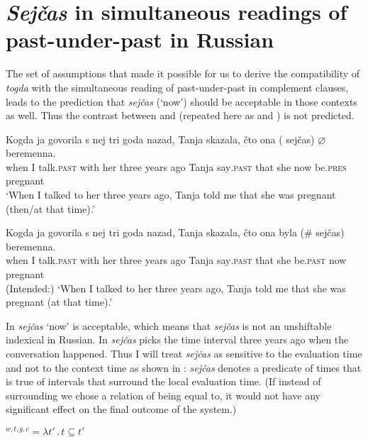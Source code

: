 \documentclass[output=paper,
modfonts,
newtxmath,
hidelinks
]{langscibook}
\begin{document}
\section{\textit{Sejčas} in simultaneous readings of past-under-past in Russian}\label{20:s3}

The set of assumptions that made it possible for us to derive the compatibility of \textit{togda} with the simultaneous reading of past-under-past in complement clauses, leads to the prediction that \textit{sejčas} (‘now’) should be acceptable in those contexts as well. Thus the contrast between  and  (repeated here as  and ) is not predicted.

\ea \label{20:ex43}
\gll Kogda ja govorila s nej tri goda nazad, Tanja skazala, čto ona\hspace{5pt} (\hspace{-2pt} sejčas) ${\varnothing}$ beremenna.\\
     when I talk\textsc{.past} with her three years ago Tanja say\textsc{.past} that she {} now be.\textsc{pres} pregnant\\
\glt `When I talked to her three years ago, Tanja told me that she was pregnant (then/at that time).'
\z

\ea \label{20:ex44}
\gll Kogda ja govorila s nej tri goda nazad, Tanja skazala, čto ona byla (\#\hspace{-2pt} sejčas) beremenna.\\
     when I talk\textsc{.past} with her three years ago Tanja say\textsc{.past} that she be.\textsc{past} {} now pregnant\\
\glt (Intended:) `When I talked to her three years ago, Tanja told me that she was pregnant (at that time).'
\z

\noindent In  \textit{sejčas} ‘now’ is acceptable, which means that \textit{sejčas} is not an unshiftable indexical in Russian. In  \textit{sejčas} picks the time interval three years ago when the conversation happened. Thus I will treat \textit{sejčas} as sensitive to the evaluation time and not to the context time as shown in : \textit{sejčas} denotes a predicate of times that is true of intervals that surround the local evaluation time. (If instead of surrounding we chose a relation of being equal to, it would not have any significant effect on the final outcome of the system.)

\ea {}$^{w,t,g,c}=\lambda t'\,.\,t\subseteq t'$\label{20:ex45}
\z
\end{document}
